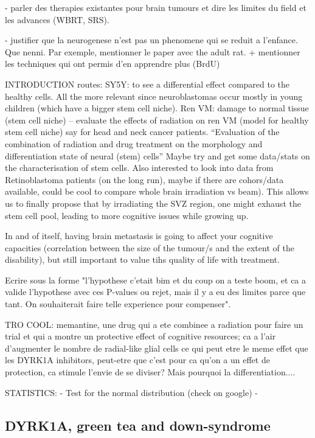 \documentclass[onecolumn,10pt]{asme2ej}
\begin{document}
- parler des therapies existantes pour brain tumours et dire les limites du field et les advances (WBRT, SRS). 

- justifier que la neurogenese n'est pas un phenomene qui se reduit a l'enfance. Que nenni. Par exemple, mentionner le paper avec the adult rat. + mentionner les techniques qui ont permis d'en apprendre plus (BrdU)


INTRODUCTION routes:
SY5Y: to see a differential effect compared to the healthy cells. All the more relevant since neuroblastomas occur mostly in young children (which have a bigger stem cell niche).
Ren VM: damage to normal tissue (stem cell niche) – evaluate the effects of radiation on ren VM (model for healthy stem cell niche) say for head and neck cancer patients. 
“Evaluation of the combination of radiation and drug treatment on the morphology and differentiation state of neural (stem) cells”
Maybe try and get some data/stats on the characterisation of stem cells.
Also interested to look into data from Retinoblastoma patients (on the long run), maybe if there are cohors/data available, could be cool to compare whole brain irradiation vs beam). This allows us to finally propose that by irradiating the SVZ region, one might exhaust the stem cell pool, leading to more cognitive issues while growing up. 

In and of itself, having brain metastasis is going to affect your cognitive capacities (correlation between the size of the tumour/s and the extent of the disability), but still important to value tihs quality of life with treatment. 


Ecrire sous la forme "l'hypothese c'etait bim et du coup on a teste boom, et ca a valide l'hypothese avec ces P-values ou rejet, mais il y a eu des limites parce que tant. On souhaiterait faire telle experience pour compenser". 

TRO COOL: memantine, une drug qui a ete combinee a radiation pour faire un trial et qui a montre un protective effect of cognitive resources; ca a l'air d'augmenter le nombre de radial-like glial cells ce qui peut etre le meme effet que les DYRK1A inhibitors, peut-etre que c'est pour ca qu'on a un effet de protection, ca stimule l'envie de se diviser? Mais pourquoi la differentiation.... 

STATISTICS:
-	Test for the normal distribution (check on google)
-	



\subsection{DYRK1A, green tea and down-syndrome}
\end{document}
